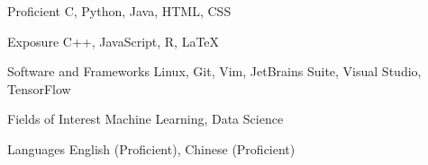 

\begin{cvskills}

  \cvskill
    {Proficient} %
    {C, Python, Java, HTML, CSS} %

  \cvskill
    {Exposure} %
    {C++, JavaScript, R, LaTeX} %

  \cvskill
    {Software and Frameworks} %
    {Linux, Git, Vim, JetBrains Suite, Visual Studio, TensorFlow} %

  \cvskill
    {Fields of Interest} %
    {Machine Learning, Data Science} %

  \cvskill
    {Languages} %
    {English (Proficient), Chinese (Proficient)} %

\end{cvskills}
